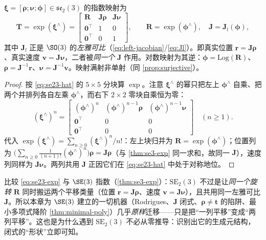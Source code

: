 \begin{theorem}\label{thm:se23-exp}
$\boldsymbol{\xi}=[\boldsymbol{\rho};\boldsymbol{\nu};\boldsymbol{\phi}]\in\mathfrak{se}_2(3)$ 的指数映射为
\begin{equation}
  \mathbf{T}=\exp(\boldsymbol{\xi}^\wedge)
  =\begin{bmatrix}\mathbf{R}&\mathbf{J}\boldsymbol{\rho}&\mathbf{J}\boldsymbol{\nu}\\\mathbf{0}^\top&1&0\\\mathbf{0}^\top&0&1\end{bmatrix},
  \qquad \mathbf{R}=\exp(\boldsymbol{\phi}^\wedge),\quad \mathbf{J}=\mathbf{J}_l(\boldsymbol{\phi}),
  \label{eq:se23-exp}
\end{equation}
其中 $\mathbf{J}_l$ 正是 $\SO(3)$ 的\emph{左雅可比}（\cref{eq:left-jacobian}/\cref{eq:Jl}）。即真实位置 $\mathbf{r}=\mathbf{J}\boldsymbol{\rho}$、真实速度 $\mathbf{v}=\mathbf{J}\boldsymbol{\nu}$，二者被\emph{同一个} $\mathbf{J}$ 作用。对数映射为其逆：$\boldsymbol{\phi}=\mathrm{Log}(\mathbf{R})$、$\boldsymbol{\rho}=\mathbf{J}^{-1}\mathbf{r}$、$\boldsymbol{\nu}=\mathbf{J}^{-1}\mathbf{v}$。映射满射非单射（同 \cref{prop:surjective}）。
\end{theorem}
\begin{proof}
按 \cref{eq:se23-hat} 的 $5\times5$ 分块算 $\exp$。注意 $\boldsymbol{\xi}^\wedge$ 的幂只把左上 $\boldsymbol{\phi}^\wedge$ 自乘、把两个并排列各自左乘 $\boldsymbol{\phi}^\wedge$，而右下 $2\times2$ 零块自乘恒为零：
\[
  (\boldsymbol{\xi}^\wedge)^n=\begin{bmatrix}(\boldsymbol{\phi}^\wedge)^n&(\boldsymbol{\phi}^\wedge)^{n-1}\boldsymbol{\rho}&(\boldsymbol{\phi}^\wedge)^{n-1}\boldsymbol{\nu}\\\mathbf{0}^\top&0&0\\\mathbf{0}^\top&0&0\end{bmatrix}\quad(n\ge1).
\]
代入 $\exp(\boldsymbol{\xi}^\wedge)=\sum_{n\ge0}(\boldsymbol{\xi}^\wedge)^n/n!$：左上块归并为 $\mathbf{R}=\exp(\boldsymbol{\phi}^\wedge)$；位置列为 $\big(\sum_{n\ge0}\tfrac{1}{(n+1)!}(\boldsymbol{\phi}^\wedge)^n\big)\boldsymbol{\rho}=\mathbf{J}\boldsymbol{\rho}$（与 \cref{thm:se3-exp} 同一求和，故同一 $\mathbf{J}$），速度列同样为 $\mathbf{J}\boldsymbol{\nu}$。两列共用 $\mathbf{J}$ 正因它们在 \cref{eq:se23-hat} 中处于对称地位。
\end{proof}

\begin{insight}
比较 \cref{eq:se23-exp} 与 $\SE(3)$ 指数（\cref{thm:se3-exp}）：$\mathrm{SE}_2(3)$ 不过是让\emph{同一个旋转} $\mathbf{R}$ 同时搬运两个平移类量（位置 $\mathbf{r}=\mathbf{J}\boldsymbol{\rho}$、速度 $\mathbf{v}=\mathbf{J}\boldsymbol{\nu}$），且共用同一左雅可比 $\mathbf{J}$。所以本章为 $\SE(3)$ 建立的一切机器（Rodrigues、$\mathbf{J}$ 闭式、$\boldsymbol{\rho}\neq\mathbf{t}$ 的陷阱、最小多项式降阶 \cref{thm:minimal-poly}）几乎\emph{原样}迁移——只是把“一列平移”变成“两列平移”。这也是为什么遇到 $\mathrm{SE}_2(3)$ 不必从零推导：识别出它的生成元结构，闭式的“形状”立即可知。
\end{insight}

